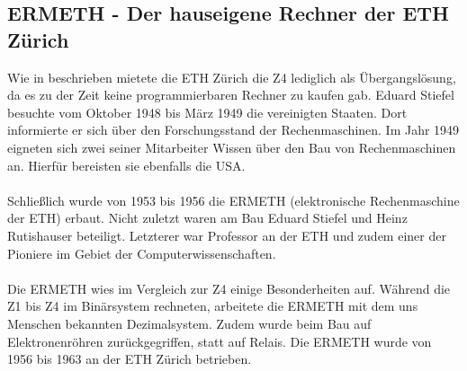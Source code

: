 \subsection{ERMETH - Der hauseigene Rechner der ETH Zürich}
Wie in \cite{bruderer2011konrad} beschrieben mietete die ETH Zürich die Z4 lediglich als Übergangslösung, da es zu der Zeit keine programmierbaren Rechner zu kaufen gab. Eduard Stiefel besuchte vom Oktober 1948 bis März 1949 die vereinigten Staaten. Dort informierte er sich über den Forschungsstand der Rechenmaschinen. Im Jahr 1949 eigneten sich zwei seiner Mitarbeiter Wissen über den Bau von Rechenmaschinen an. Hierfür bereisten sie ebenfalls die USA.\\\\
Schließlich wurde von 1953 bis 1956 die ERMETH (elektronische Rechenmaschine der ETH) erbaut. Nicht zuletzt waren am Bau Eduard Stiefel und Heinz Rutishauser beteiligt. Letzterer war Professor an der ETH und zudem einer der Pioniere im Gebiet der Computerwissenschaften.\\\\
Die ERMETH wies im Vergleich zur Z4 einige Besonderheiten auf. Während die Z1 bis Z4 im Binärsystem rechneten, arbeitete die ERMETH mit dem uns Menschen bekannten Dezimalsystem. Zudem wurde beim Bau auf Elektronenröhren zurückgegriffen, statt auf Relais. Die ERMETH wurde von 1956 bis 1963 an der ETH Zürich betrieben.